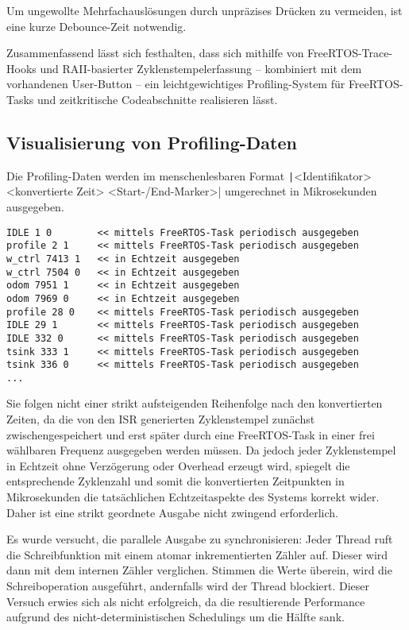 Um ungewollte Mehrfachauslösungen durch unpräzises Drücken zu vermeiden, ist
eine kurze Debounce-Zeit notwendig.

Zusammenfassend lässt sich festhalten, dass sich mithilfe von
FreeRTOS-Trace-Hooks und RAII-basierter Zyklenstempelerfassung – kombiniert mit
dem vorhandenen User-Button – ein leichtgewichtiges Profiling-System für
FreeRTOS-Tasks und zeitkritische Codeabschnitte realisieren lässt.

\subsection{Visualisierung von Profiling-Daten}

Die Profiling-Daten werden im menschenlesbaren Format
\texttt|<Identifikator> <konvertierte Zeit> <Start-/End-Marker>|
umgerechnet in Mikrosekunden ausgegeben.

\begin{code}
\begin{verbatim}
IDLE 1 0        << mittels FreeRTOS-Task periodisch ausgegeben
profile 2 1     << mittels FreeRTOS-Task periodisch ausgegeben
w_ctrl 7413 1   << in Echtzeit ausgegeben
w_ctrl 7504 0   << in Echtzeit ausgegeben
odom 7951 1     << in Echtzeit ausgegeben
odom 7969 0     << in Echtzeit ausgegeben
profile 28 0    << mittels FreeRTOS-Task periodisch ausgegeben
IDLE 29 1       << mittels FreeRTOS-Task periodisch ausgegeben
IDLE 332 0      << mittels FreeRTOS-Task periodisch ausgegeben
tsink 333 1     << mittels FreeRTOS-Task periodisch ausgegeben
tsink 336 0     << mittels FreeRTOS-Task periodisch ausgegeben
...
\end{verbatim}
\end{code}

Sie folgen nicht einer strikt aufsteigenden Reihenfolge nach den konvertierten
Zeiten, da die von den ISR generierten Zyklenstempel zunächst
zwischengespeichert und erst später durch eine FreeRTOS-Task in einer frei
wählbaren Frequenz ausgegeben werden müssen. Da jedoch jeder Zyklenstempel in
Echtzeit ohne Verzögerung oder Overhead erzeugt wird, spiegelt die entsprechende
Zyklenzahl und somit die konvertierten Zeitpunkten in Mikrosekunden die
tatsächlichen Echtzeitaspekte des Systems korrekt wider. Daher ist eine strikt
geordnete Ausgabe nicht zwingend erforderlich.

Es wurde versucht, die parallele Ausgabe zu synchronisieren: Jeder Thread ruft
die Schreibfunktion mit einem atomar inkrementierten Zähler auf. Dieser wird
dann mit dem internen Zähler verglichen. Stimmen die Werte überein, wird die
Schreiboperation ausgeführt, andernfalls wird der Thread blockiert. Dieser
Versuch erwies sich als nicht erfolgreich, da die resultierende Performance
aufgrund des nicht-deterministischen Schedulings um die Hälfte sank.

